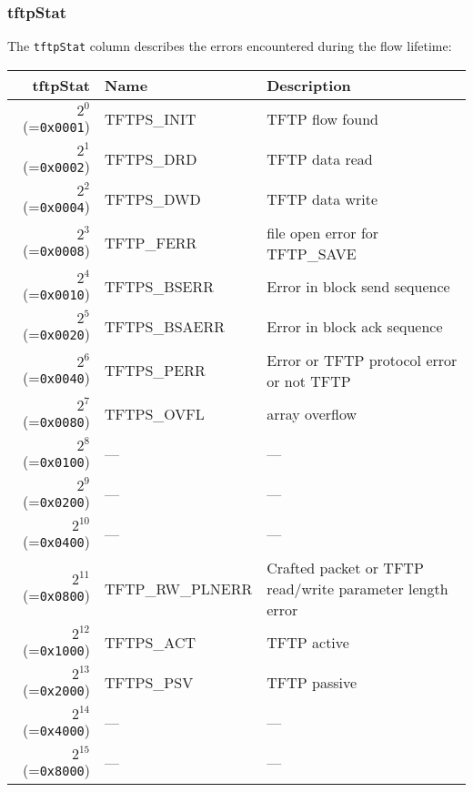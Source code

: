\documentclass[documentation]{subfiles}
\begin{document}
\subsubsection{tftpStat}\label{tftpStat}
The {\tt tftpStat} column describes the errors encountered during the flow lifetime:
\begin{longtable}{rll}
    \toprule
    {\bf tftpStat} & {\bf Name} & {\bf Description} \\
    \midrule\endhead%
    $2^{0}$  (={\tt 0x0001}) & TFTPS\_INIT & TFTP flow found \\
    $2^{1}$  (={\tt 0x0002}) & TFTPS\_DRD & TFTP data read \\
    $2^{2}$  (={\tt 0x0004}) & TFTPS\_DWD & TFTP data write \\
    $2^{3}$  (={\tt 0x0008}) & TFTP\_FERR & file open error for TFTP\_SAVE\\
    $2^{4}$  (={\tt 0x0010}) & TFTPS\_BSERR & Error in block send sequence \\
    $2^{5}$  (={\tt 0x0020}) & TFTPS\_BSAERR & Error in block ack sequence \\
    $2^{6}$  (={\tt 0x0040}) & TFTPS\_PERR & Error or TFTP protocol error or not TFTP \\
    $2^{7}$  (={\tt 0x0080}) & TFTPS\_OVFL & array overflow \\
    $2^{8}$  (={\tt 0x0100}) & --- & --- \\
    $2^{9}$  (={\tt 0x0200}) & --- & --- \\
    $2^{10}$ (={\tt 0x0400}) & --- & --- \\
    $2^{11}$ (={\tt 0x0800}) & TFTP\_RW\_PLNERR &  Crafted packet or TFTP read/write parameter length error \\
    $2^{12}$ (={\tt 0x1000}) & TFTPS\_ACT & TFTP active \\
    $2^{13}$ (={\tt 0x2000}) & TFTPS\_PSV & TFTP passive \\
    $2^{14}$ (={\tt 0x4000}) & --- & --- \\
    $2^{15}$ (={\tt 0x8000}) & --- & --- \\
    \bottomrule
\end{longtable}
\end{document}
